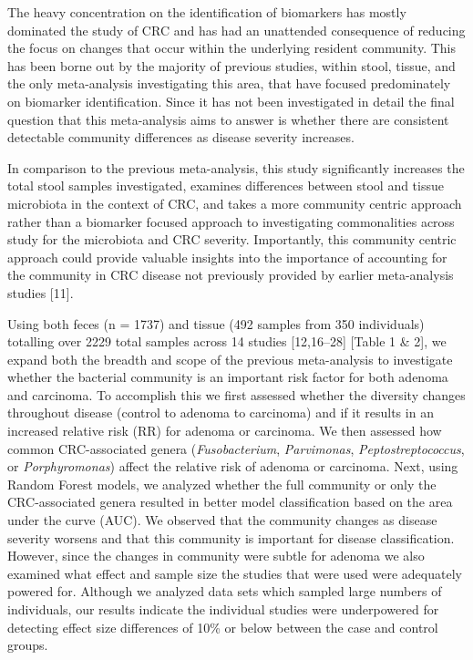 \documentclass[12pt,]{article}
\begin{document}
The heavy concentration on the identification of biomarkers has mostly
dominated the study of CRC and has had an unattended consequence of
reducing the focus on changes that occur within the underlying resident
community. This has been borne out by the majority of previous studies,
within stool, tissue, and the only meta-analysis investigating this
area, that have focused predominately on biomarker identification. Since
it has not been investigated in detail the final question that this
meta-analysis aims to answer is whether there are consistent detectable
community differences as disease severity increases.

In comparison to the previous meta-analysis, this study significantly
increases the total stool samples investigated, examines differences
between stool and tissue microbiota in the context of CRC, and takes a
more community centric approach rather than a biomarker focused approach
to investigating commonalities across study for the microbiota and CRC
severity. Importantly, this community centric approach could provide
valuable insights into the importance of accounting for the community in
CRC disease not previously provided by earlier meta-analysis studies
{[}11{]}.

Using both feces (n = 1737) and tissue (492 samples from 350
individuals) totalling over 2229 total samples across 14 studies
{[}12,16--28{]} {[}Table 1 \& 2{]}, we expand both the breadth and scope
of the previous meta-analysis to investigate whether the bacterial
community is an important risk factor for both adenoma and carcinoma. To
accomplish this we first assessed whether the diversity changes
throughout disease (control to adenoma to carcinoma) and if it results
in an increased relative risk (RR) for adenoma or carcinoma. We then
assessed how common CRC-associated genera (\emph{Fusobacterium},
\emph{Parvimonas}, \emph{Peptostreptococcus}, or \emph{Porphyromonas})
affect the relative risk of adenoma or carcinoma. Next, using Random
Forest models, we analyzed whether the full community or only the
CRC-associated genera resulted in better model classification based on
the area under the curve (AUC). We observed that the community changes
as disease severity worsens and that this community is important for
disease classification. However, since the changes in community were
subtle for adenoma we also examined what effect and sample size the
studies that were used were adequately powered for. Although we analyzed
data sets which sampled large numbers of individuals, our results
indicate the individual studies were underpowered for detecting effect
size differences of 10\% or below between the case and control groups.
\end{document}
